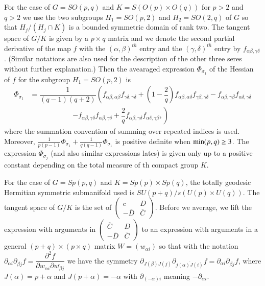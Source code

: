 For the case of $G=SO(p,q)$ and $K=S(O(p)\times O(q))$ for $p > 2$ and $q > 2$ we use the two subgroups $H_{1}=SO(p,2)$ and $H_{2}=SO(2,q)$ of $G$ so that $H_{j}/(H_{j}\cap K)$ is a bounded symmetric domain of rank two. The tangent space of $G/K$ is given by a $p \times q$ matrix and we denote the second partial derivative of the map $f$ with the $(\alpha, \beta)^{th}$ entry and the $(\gamma, \delta)^{th}$ entry by $f_{\alpha \beta, \gamma \delta}$. (Similar notations are also used for the description of the other three seres without further explanation.) Then the avearaged expression $\Phi_{\sigma_{1}}$ of the Hessian of $f$ for the subgroup $H_{1}=SO(p,2)$ is
\begin{equation*}
\begin{split}
\Phi_{\sigma_{1}}&= \dfrac{1}{(q-1)(q+2)}\left( f_{\alpha \beta, \alpha \beta}f_{\gamma \delta,\gamma \delta}+ \left(1-\dfrac{2}{q}\right)f_{\alpha \beta, \alpha \delta}f_{\gamma \beta,\gamma \delta}-f_{\alpha \beta, \gamma \beta}
f_{\alpha \delta, \gamma \delta}\right.\\
&\qquad \qquad \qquad \left.-f_{\alpha \beta, \gamma \delta}f_{\alpha \beta, \gamma \delta} + \dfrac{2}{q}f_{\alpha \beta, \gamma \delta}f_{\alpha \delta, \gamma \beta},\right)
\end{split}
\end{equation*}
where the summation convention of summing over repeated indices is used. Moreover, $\frac{1}{p(p-1)}\Phi_{\sigma_{1}} + \frac{1}{q(q-1)}\Phi_{\sigma_{1}}$ is positive definite when $\min(p,q)\break \geq 3$. The expression $\Phi_{\sigma_{j}}$ (and also similar expressions lates) is given only up to a positive constant depending on the total measure of th compact group $K$.

For the case of $G=Sp(p,q)$ and $K=Sp(p)\times Sp(q)$, the  totally geodesic Hermitian symmetric submanifold used is
$SU(p + q)/s(U(p) \times U(q))$. The tangent space of $G/K$ is the set of
$\begin{pmatrix}
c & D\\
-\overline{D} & \overline{C}
\end{pmatrix}$. Before we average, we lift the expression with arguments in $\begin{pmatrix}
\overline{C} & D\\
-\overline{D} & \overline{C}
\end{pmatrix}$ to an expression with arguments in a general $(p + q)\times (p \times q)$ matrix $W=(w_{\alpha i})$ so that with the notation $\partial_{\alpha i} \partial_{\overline{\beta j}}f=\dfrac{\partial^{2}f}{\partial w_{\alpha i}\partial\overline{w_{\beta j}}}$ we have the symmetry $\partial_{J(\beta)J(j)}\partial_{\overline{j(\alpha)J(i)}}f=\partial_{\alpha i}\partial_{\overline{\beta j}}f$, where $J(\alpha) = p+ \alpha$ and $J(p +\alpha) = -\alpha$ with $\partial_{(-\alpha)i}$ meaning $-\partial_{\alpha i}$.

